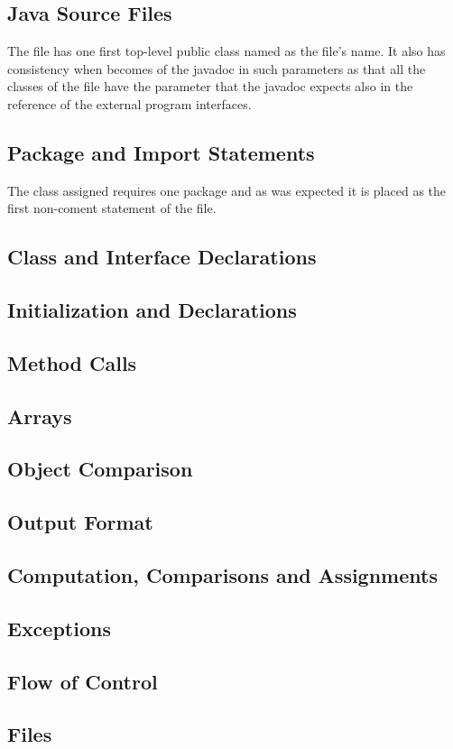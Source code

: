 \documentclass[a4paper]{article}
\begin{document}
\subsection{Java Source Files}
The file has one first top-level public class named as the file's name. It also has consistency when becomes of the javadoc in such parameters as that all the classes of the file have the parameter that the javadoc expects also in the reference of the external program interfaces.
\subsection{Package and Import Statements}
The class assigned requires one package and as was expected  it is placed as the first non-coment statement of the file.
\subsection{Class and Interface Declarations}
\subsection{Initialization and Declarations}
\subsection{Method Calls}
\subsection{Arrays}
\subsection{Object Comparison}
\subsection{Output Format}
\subsection{Computation, Comparisons and Assignments}
\subsection{Exceptions}
\subsection{Flow of Control}
\subsection{Files}
\end{document}
